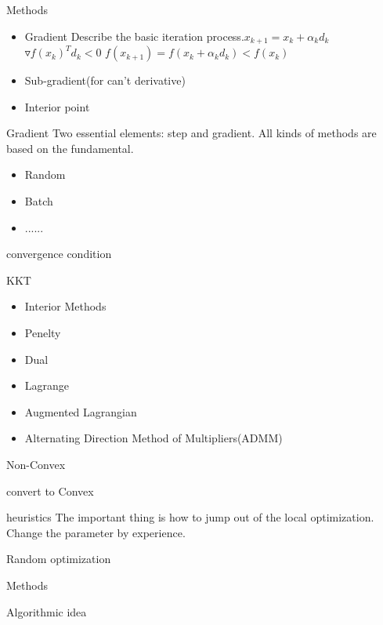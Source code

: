     \begin{frame}{Methods}
      \begin{itemize}
        \item Gradient
        Describe the basic iteration process.$x_{k+1}=x_k+\alpha_k d_k$
        $\triangledown f(x_k)^Td_k < 0$
        $f(x_{k+1}) = f(x_k+\alpha_k d_k) < f(x_k)$
        \item Sub-gradient(for can't derivative)
        \item Interior point
      \end{itemize}
    \end{frame}

    \begin{frame}{Gradient}
      Two essential elements: step and gradient. All kinds of methods are based on the fundamental.
      \begin{itemize}
        \item Random
        \item Batch
        \item ......
      \end{itemize}
      convergence condition
    \end{frame}

\begin{frame}{KKT}
  \begin{itemize}
    \item Interior Methods
    \item Penelty
    \item Dual
    \item Lagrange
    \item Augmented Lagrangian
    \item Alternating Direction Method of Multipliers(ADMM)
  \end{itemize}
\end{frame}

\begin{frame}{Non-Convex}
  \item convert to Convex
  \item heuristics
  The important thing is how to jump out of the local optimization.
  Change the parameter by experience.
\end{frame}

\begin{frame}{Random optimization}
  \item Methods
  \item Algorithmic idea
\end{frame}
